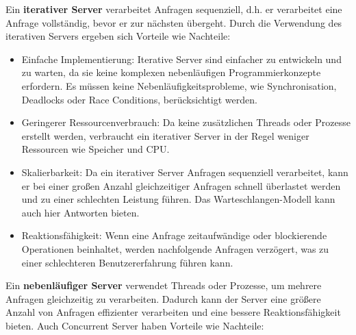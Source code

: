 \documentclass[../vs-script-first-v01.tex]{subfiles}
\begin{document}
Ein \textbf{iterativer Server} verarbeitet Anfragen sequenziell, d.h. er verarbeitet eine Anfrage vollständig, bevor er zur nächsten übergeht.  Durch die Verwendung des iterativen Servers ergeben sich Vorteile wie Nachteile:
\begin{itemize}
\item Einfache Implementierung: Iterative Server sind einfacher zu entwickeln und zu warten, da sie keine komplexen nebenläufigen Programmierkonzepte erfordern. Es müssen keine Nebenläufigkeitsprobleme, wie Synchronisation, Deadlocks oder Race Conditions, berücksichtigt werden.
\item Geringerer Ressourcenverbrauch: Da keine zusätzlichen Threads oder Prozesse erstellt werden, verbraucht ein iterativer Server in der Regel weniger Ressourcen wie Speicher und CPU.
\item Skalierbarkeit: Da ein iterativer Server Anfragen sequenziell verarbeitet, kann er bei einer großen Anzahl gleichzeitiger Anfragen schnell überlastet werden und zu einer schlechten Leistung führen. Das Warteschlangen-Modell kann auch hier Antworten bieten.
\item Reaktionsfähigkeit: Wenn eine Anfrage zeitaufwändige oder blockierende Operationen beinhaltet, werden nachfolgende Anfragen verzögert, was zu einer schlechteren Benutzererfahrung führen kann.
\end{itemize}
Ein \textbf{nebenläufiger Server} verwendet Threads oder Prozesse, um mehrere Anfragen gleichzeitig zu verarbeiten. Dadurch kann der Server eine größere Anzahl von Anfragen effizienter verarbeiten und eine bessere Reaktionsfähigkeit bieten. Auch Concurrent Server haben Vorteile wie Nachteile:
\end{document}
